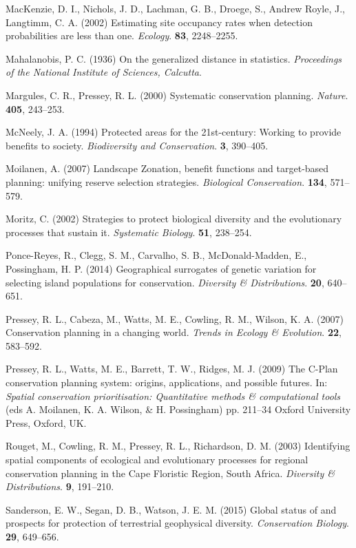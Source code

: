 \documentclass[11pt,]{article}
\begin{document}
MacKenzie, D. I., Nichols, J. D., Lachman, G. B., Droege, S., Andrew
Royle, J., Langtimm, C. A. (2002) Estimating site occupancy rates when
detection probabilities are less than one. \emph{Ecology}. \textbf{83},
2248--2255.

Mahalanobis, P. C. (1936) On the generalized distance in statistics.
\emph{Proceedings of the National Institute of Sciences, Calcutta}.

Margules, C. R., Pressey, R. L. (2000) Systematic conservation planning.
\emph{Nature}. \textbf{405}, 243--253.

McNeely, J. A. (1994) Protected areas for the 21st-century: Working to
provide benefits to society. \emph{Biodiversity and Conservation}.
\textbf{3}, 390--405.

Moilanen, A. (2007) Landscape Zonation, benefit functions and
target-based planning: unifying reserve selection strategies.
\emph{Biological Conservation}. \textbf{134}, 571--579.

Moritz, C. (2002) Strategies to protect biological diversity and the
evolutionary processes that sustain it. \emph{Systematic Biology}.
\textbf{51}, 238--254.

Ponce-Reyes, R., Clegg, S. M., Carvalho, S. B., McDonald-Madden, E.,
Possingham, H. P. (2014) Geographical surrogates of genetic variation
for selecting island populations for conservation. \emph{Diversity \&
Distributions}. \textbf{20}, 640--651.

Pressey, R. L., Cabeza, M., Watts, M. E., Cowling, R. M., Wilson, K. A.
(2007) Conservation planning in a changing world. \emph{Trends in
Ecology \& Evolution}. \textbf{22}, 583--592.

Pressey, R. L., Watts, M. E., Barrett, T. W., Ridges, M. J. (2009) The
C-Plan conservation planning system: origins, applications, and possible
futures. In: \emph{Spatial conservation prioritisation: Quantitative
methods \& computational tools} (eds A. Moilanen, K. A. Wilson, \& H.
Possingham) pp. 211--34 Oxford University Press, Oxford, UK.

Rouget, M., Cowling, R. M., Pressey, R. L., Richardson, D. M. (2003)
Identifying spatial components of ecological and evolutionary processes
for regional conservation planning in the Cape Floristic Region, South
Africa. \emph{Diversity \& Distributions}. \textbf{9}, 191--210.

Sanderson, E. W., Segan, D. B., Watson, J. E. M. (2015) Global status of
and prospects for protection of terrestrial geophysical diversity.
\emph{Conservation Biology}. \textbf{29}, 649--656.
\end{document}

